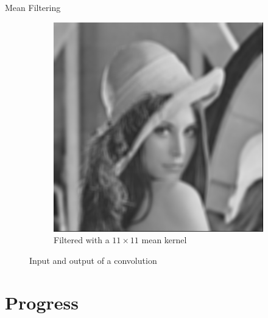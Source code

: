 \documentclass[british, svgnames, dvipsnames]{upb-beamer}
\newcommand{\stimes}{{\times}} %
\begin{document}
\begin{frame}{Mean Filtering}
\begin{figure}[h!]
\begin{subfigure}[b]{0.49\textwidth}
            \centering
            \includegraphics[width=\linewidth]{img/filtered.png}
            \caption{Filtered with a $11\stimes11$ mean kernel}
            \label{fig:filtered}
        \end{subfigure}
        \caption{Input and output of a convolution}
        \label{fig:avrs}
    \end{figure}
\end{frame}

\section{Progress}
\end{document}
